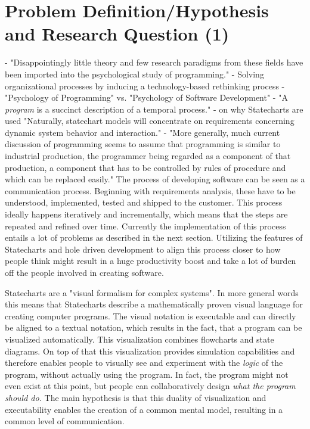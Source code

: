 \chapter{Problem Definition/Hypothesis and Research Question (1)}
- "Disappointingly little theory and few research paradigms from these fields have been imported into the psychological study of programming." \autocite[253]{curtis_psychology_1990}
- Solving organizational processes by inducing a technology-based rethinking process \autocite[266]{curtis_psychology_1990}
- "Psychology of Programming" vs. "Psychology of Software Development" \autocite[267]{curtis_psychology_1990}
- "A \emph{program} is a succinct description of a temporal process." \autocite[3]{green_pictures_1982}
- on why Statecharts are used "Naturally, statechart models will concentrate on requirements concerning dynamic system behavior and interaction." \autocite[1]{glinz_statecharts_2002}
- "More generally, much current discussion of programming seems to assume that programming is similar to industrial production, the programmer being regarded as a component of that production, a component that has to be controlled by rules of procedure and which can be replaced easily." \autocite[237]{naur_programming_1985}
The process of developing software can be seen as a communication process. Beginning with requirements analysis, these have to be understood, implemented, tested and shipped to the customer. This process ideally happens iteratively and incrementally, which means that the steps are repeated and refined over time.
Currently the implementation of this process entails a lot of problems as described in the next section.
Utilizing the features of Statecharts and hole driven development to align this process closer to how people think might result in a huge productivity boost and take a lot of burden off the people involved in creating software.

Statecharts \autocite{harel_statecharts:_1987} are a "visual formalism for complex systems". In more general words this means that Statecharts describe a mathematically proven visual language for creating computer programs. The visual notation is executable and can directly be aligned to a textual notation, which results in the fact, that a program can be visualized automatically. This visualization combines flowcharts and state diagrams. On top of that this visualization provides simulation capabilities and therefore enables people to visually see and experiment with the \emph{logic} of the program, without actually using the program. In fact, the program might not even exist at this point, but people can collaboratively design \emph{what the program should do.} The main hypothesis is that this duality of visualization and executability enables the creation of a common mental model, resulting in a common level of communication.

